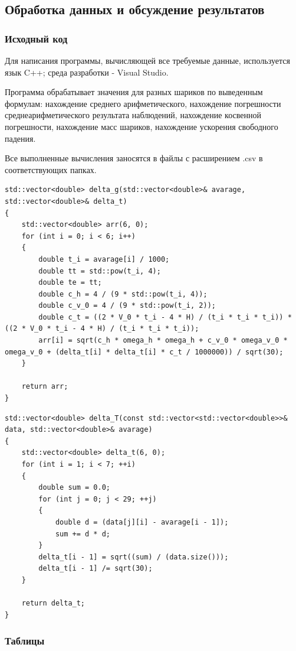 \subsection{Обработка данных и обсуждение результатов}

\subsubsection{Исходный код}
Для написания программы, вычисляющей все требуемые данные, используется язык C++; среда разработки - Visual Studio.

Программа обрабатывает значения для разных шариков по выведенным формулам: нахождение среднего арифметического, нахождение погрешности среднеарифметического результата наблюдений, нахождение косвенной погрешности, нахождение масс шариков, нахождение ускорения свободного падения.

Все выполненные вычисления заносятся в файлы с расширением .csv в соответствующих папках.

\begin{lstlisting}[label=listing1, caption=Функция для нахождения $\Delta g$]
std::vector<double> delta_g(std::vector<double>& avarage, std::vector<double>& delta_t)
{
	std::vector<double> arr(6, 0);
	for (int i = 0; i < 6; i++)
	{
		double t_i = avarage[i] / 1000;
		double tt = std::pow(t_i, 4);
		double te = tt;
		double c_h = 4 / (9 * std::pow(t_i, 4));
		double c_v_0 = 4 / (9 * std::pow(t_i, 2));
		double c_t = ((2 * V_0 * t_i - 4 * H) / (t_i * t_i * t_i)) * ((2 * V_0 * t_i - 4 * H) / (t_i * t_i * t_i));
		arr[i] = sqrt(c_h * omega_h * omega_h + c_v_0 * omega_v_0 * omega_v_0 + (delta_t[i] * delta_t[i] * c_t / 1000000)) / sqrt(30);
	}

	return arr;
}
\end{lstlisting}

\begin{lstlisting}[label=listing2, caption=Функция для нахождения $\Delta t$]
std::vector<double> delta_T(const std::vector<std::vector<double>>& data, std::vector<double>& avarage)
{
	std::vector<double> delta_t(6, 0);
	for (int i = 1; i < 7; ++i)
	{
		double sum = 0.0;
		for (int j = 0; j < 29; ++j)
		{
			double d = (data[j][i] - avarage[i - 1]);
			sum += d * d;
		}
		delta_t[i - 1] = sqrt((sum) / (data.size()));
		delta_t[i - 1] /= sqrt(30);
	}

	return delta_t;
}
\end{lstlisting}
\newpage
\subsubsection{Таблицы}



